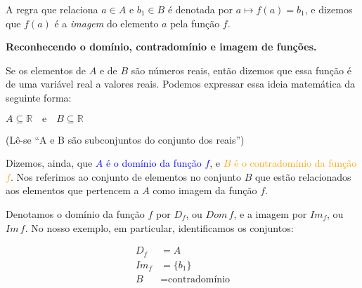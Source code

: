 \documentclass[12pt,openright,twoside,a4paper]{article}
\theoremstyle{definition}
\begin{document}
	A regra que relaciona $a \in A$ e $b_1 \in B$ é denotada por $a \mapsto f(a) = b_1$, e dizemos que $f(a)$ é a \textit{imagem} do elemento $a$ pela função $f$.

	
	\textbf{Reconhecendo o domínio, contradomínio e imagem de funções.}
	
	Se os elementos de $A$ e de $B$ são números reais, então dizemos que essa função é de uma variável real a valores reais. Podemos expressar essa ideia matemática da seguinte forma:
	
	\begin{center}
		$A \subseteq \mathbb{R} \quad \text{e} \quad B \subseteq \mathbb{R}$
		
		(Lê-se ``A e B são subconjuntos do conjunto dos reais'')
	\end{center}

	
	Dizemos, ainda, que \textcolor{blue}{$A$ é o domínio da função $f$}, e \textcolor{orange}{$B$ é o contradomínio da função $f$}. Nos referimos ao conjunto de elementos no conjunto $B$ que estão relacionados aos elementos que pertencem a $A$ como imagem da função $f$.
	
	Denotamos o domínio da função $f$ por $D_f$, ou $Dom\,f$, e a imagem por $Im_f$, ou $Im\,f$. No nosso exemplo, em particular, identificamos os conjuntos:
	
	\begin{align*}
		D_f &= A\\
		Im_f &= \{b_1\}\\
		B &= \text{contradomínio}
	\end{align*}
	
\end{document}
